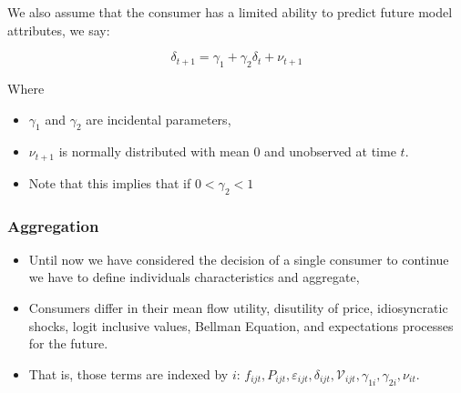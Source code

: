 \documentclass{beamer}
\theoremstyle{definition}
\begin{document}
\begin{frame}

  We also assume that the consumer has a limited ability to predict future
  model attributes, we say:

  \[
    \delta_{t+1} = \gamma_1 + \gamma_2 \delta_t + \nu_{t+1}
  \]
  
  Where
  
  \begin{itemize}
    \item $\gamma_1$ and $\gamma_2$ are incidental parameters,
    \item $\nu_{t+1}$ is normally distributed with mean $0$ and unobserved at 
      time $t$.
    \item Note that this implies that if $ 0 < \gamma_2 < 1 $
  \end{itemize}

\end{frame}




\begin{frame}
  \frametitle{Aggregation}

  \begin{itemize}
    \item Until now we have considered the decision of a single consumer to continue
      we have to define individuals characteristics and aggregate,
    \item Consumers differ in their mean flow utility, disutility of price,
      idiosyncratic shocks, logit inclusive values, Bellman Equation, and
      expectations processes for the future.
    \item That is, those terms are indexed by $i$: $f_{ijt}, P_{ijt},
      \varepsilon_{ijt}, \delta_{ijt}, \mathcal{V}_{ijt}, \gamma_{1i},
      \gamma_{2i}, \nu_{it}$.
  \end{itemize}
\end{frame}
\end{document}
